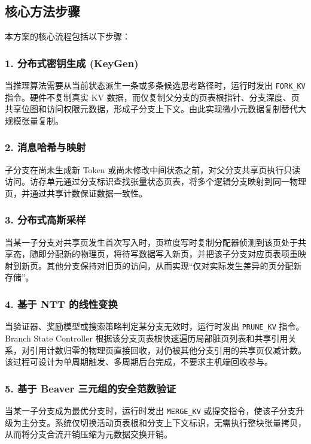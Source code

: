 \documentclass[12pt,a4paper]{article}
\begin{document}
\subsection{核心方法步骤}

本方案的核心流程包括以下步骤：

\subsubsection{1. 分布式密钥生成 (KeyGen)}
当推理算法需要从当前状态派生一条或多条候选思考路径时，运行时发出 \texttt{FORK\_KV} 指令。硬件不复制真实 KV 数据，而仅复制父分支的页表根指针、分支深度、页共享位图和访问权限元数据，形成子分支上下文。由此实现微小元数据复制替代大规模张量复制。

\subsubsection{2. 消息哈希与映射}
子分支在尚未生成新 Token 或尚未修改中间状态之前，对父分支共享页执行只读访问。访存单元通过分支标识查找张量状态页表，将多个逻辑分支映射到同一物理页，并通过共享计数保证数据一致性。

\subsubsection{3. 分布式高斯采样}
当某一子分支对共享页发生首次写入时，页粒度写时复制分配器侦测到该页处于共享态，随即分配新的物理页，将待写数据写入新页，并把该子分支对应页表项重映射到新页。其他分支保持对旧页的访问，从而实现“仅对实际发生差异的页分配新存储”。

\subsubsection{4. 基于 NTT 的线性变换}
当验证器、奖励模型或搜索策略判定某分支无效时，运行时发出 \texttt{PRUNE\_KV} 指令。Branch State Controller 根据该分支页表根快速遍历局部脏页列表和共享引用关系，对引用计数归零的物理页直接回收，对仍被其他分支引用的共享页仅减计数。该过程可设计为单周期触发、多周期后台完成，不要求主机端回收参与。

\subsubsection{5. 基于 Beaver 三元组的安全范数验证}
当某一子分支成为最优分支时，运行时发出 \texttt{MERGE\_KV} 或提交指令，使该子分支升级为主分支。系统仅切换活动页表根和分支上下文标识，无需执行整块张量拷贝，从而将分支合流开销压缩为元数据交换开销。
\end{document}
